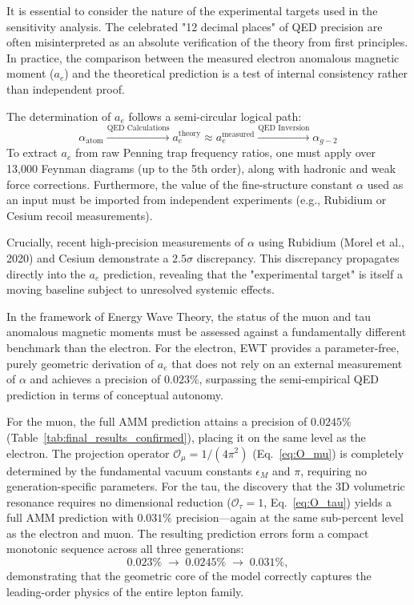\documentclass[10pt,a4paper]{article}
\begin{document}
It is essential to consider the nature of the experimental targets used in the sensitivity analysis. The celebrated "12 decimal places" of QED precision are often misinterpreted as an absolute verification of the theory from first principles. In practice, the comparison between the measured electron anomalous magnetic moment ($a_e$) and the theoretical prediction is a test of internal consistency rather than independent proof.

The determination of $a_e$ follows a semi-circular logical path:
\begin{equation}
	\alpha_{\text{atom}} \xrightarrow{\text{QED Calculations}} a_e^{\text{theory}} \approx a_e^{\text{measured}} \xrightarrow{\text{QED Inversion}} \alpha_{g-2}
\end{equation}
To extract $a_e$ from raw Penning trap frequency ratios, one must apply over 13,000 Feynman diagrams (up to the 5th order), along with hadronic and weak force corrections. Furthermore, the value of the fine-structure constant $\alpha$ used as an input must be imported from independent experiments (e.g., Rubidium or Cesium recoil measurements). 

Crucially, recent high-precision measurements of $\alpha$ using Rubidium (Morel et al., 2020) and Cesium demonstrate a $2.5\sigma$ discrepancy. This discrepancy propagates directly into the $a_e$ prediction, revealing that the "experimental target" is itself a moving baseline subject to unresolved systemic effects.

In the framework of Energy Wave Theory, the status of the muon and tau 
anomalous magnetic moments must be assessed against a fundamentally different 
benchmark than the electron. For the electron, EWT provides a parameter-free, 
purely geometric derivation of $a_e$ that does not rely on an external 
measurement of $\alpha$ and achieves a precision of $0.023\%$, surpassing the 
semi-empirical QED prediction in terms of conceptual autonomy.

For the muon, the full AMM prediction attains a precision of $0.0245\%$ 
(Table~\ref{tab:final_results_confirmed}), placing it on the same level as the 
electron. The projection operator $\mathcal{O}_\mu = 1/(4\pi^2)$ 
(Eq.~\ref{eq:O_mu}) is completely determined by the fundamental vacuum 
constants $\epsilon_M$ and $\pi$, requiring no generation-specific parameters. 
For the tau, the discovery that the 3D volumetric resonance requires no 
dimensional reduction ($\mathcal{O}_\tau = 1$, Eq.~\ref{eq:O_tau}) yields a 
full AMM prediction with $0.031\%$ precision---again at the same sub-percent 
level as the electron and muon. The resulting prediction errors form a 
compact monotonic sequence across all three generations:
\[
0.023\% \;\to\; 0.0245\% \;\to\; 0.031\%,
\]
demonstrating that the geometric core of the model correctly captures the 
leading-order physics of the entire lepton family.
\end{document}
